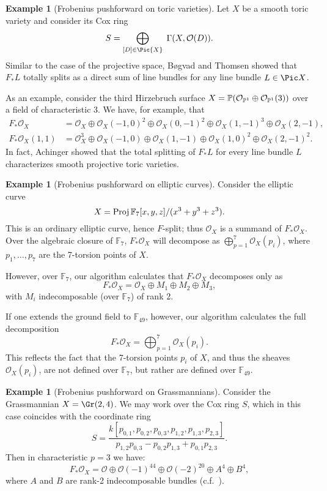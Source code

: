 \documentclass[12pt]{article}
\def\OO{\mathcal O}
\def\FF{\mathbb F}
\theoremstyle{theorem}
\numberwithin{thm}{section}
\theoremstyle{definition}
\newtheorem{exa}[thm]{Example}
\begin{document}
\begin{exa}[Frobenius pushforward on toric varieties]
  Let $X$ be a smooth toric variety and consider its Cox ring
  \[ S = \bigoplus_{[D]\in\Pic{X}} \; \Gamma(X, \OO(D)). \]
  Similar to the case of the projective space, B{\o}gvad and Thomsen \cite{Bogvad98,Thomsen00} showed that $F_*L$ totally splits as a direct sum of line bundles for any line bundle $L\in\Pic X$.

  As an example, consider the third Hirzebruch surface $X=\P(\OO_{\P^1}\oplus \OO_{\P^1}(3))$ over a field of characteristic 3. We have, for example, that
  \begin{align*}
    F_*\OO_X      &= \OO_X   \oplus \OO_X(-1,0)^2 \oplus \OO_X(0,-1)^2 \oplus \OO_X(1,-1)^3 \oplus \OO_X(2,-1), \\
    F_*\OO_X(1,1) &= \OO_X^3 \oplus \OO_X(-1,0)   \oplus \OO_X(1,-1)   \oplus \OO_X(1, 0)^2 \oplus \OO_X(2,-1)^2.
  \end{align*}
  In fact, Achinger \cite{Achinger15} showed that the total splitting of $F_*L$ for every line bundle $L$ characterizes smooth projective toric varieties.
\end{exa}

\begin{exa}[Frobenius pushforward on elliptic curves]\label{algclos}
  Consider the elliptic curve
  \[ X = \Proj \FF_7[x,y,z]/(x^3+y^3+z^3). \]
  This is an ordinary elliptic curve, hence $F$-split; thus $\OO_X$ is a summand of $F_* \OO_X$. Over the algebraic closure of $\FF_7$, $F_*\OO_X$ will decompose as $\bigoplus_{p=1}^7 \OO_X(p_i)$, where $p_1,\dots,p_7$ are the 7-torsion points of $X$.

  However, over $\FF_7$, our algorithm calculates that $F_*\OO_X$ decomposes only as
  $$ F_* \OO_X =\OO_X \oplus M_1\oplus M_2\oplus M_3, $$
  with $M_i$ indecomposable (over $\FF_7$) of rank 2.

  If one extends the ground field to $\FF_{49}$, however, our algorithm calculates the full decomposition
  $$ F_* \OO_X=\bigoplus_{p=1}^7 \OO_X(p_i). $$
  This reflects the fact that the 7-torsion points $p_i$ of $X$, and thus the sheaves $\OO_X(p_i)$, are not defined over $\FF_7$, but rather are defined over $\FF_{49}$.
\end{exa}

\begin{exa}[Frobenius pushforward on Grassmannians]
  Consider the Grassmannian $X = \Gr(2,4)$. We may work over the Cox ring $S$,
  which in this case coincides with the coordinate ring
  \[ S = \frac{k[p_{0,1},p_{0,2},p_{0,3},p_{1,2},p_{1,3},p_{2,3}]}{p_{1,2}p_{0,3}-p_{0,2}p_{1,3}+p_{0,1}p_{2,3}}. \]
  Then in characteristic $p=3$ we have:
  \[ F_*\OO_X = \OO \oplus \OO(-1)^{44} \oplus \OO(-2)^{20} \oplus A^4 \oplus B^4, \]
  where $A$ and $B$ are rank-2 indecomposable bundles (c.f.~\cite{RSVdB22}).
\end{exa}
\end{document}
